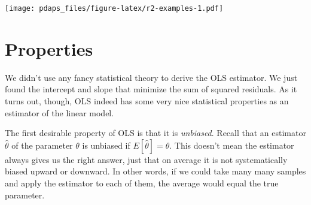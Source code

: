 \documentclass[12pt,oneside,openany]{book}
\begin{document}
\texttt{[image: pdaps\_files/figure-latex/r2-examples-1.pdf]}

\section{Properties}\label{properties}

We didn't use any fancy statistical theory to derive the OLS estimator.
We just found the intercept and slope that minimize the sum of squared
residuals. As it turns out, though, OLS indeed has some very nice
statistical properties as an estimator of the linear model.

The first desirable property of OLS is that it is \emph{unbiased}.
Recall that an estimator \(\hat{\theta}\) of the parameter \(\theta\) is
unbiased if \(E[\hat{\theta}] = \theta\). This doesn't mean the
estimator always gives us the right answer, just that on average it is
not systematically biased upward or downward. In other words, if we
could take many many samples and apply the estimator to each of them,
the average would equal the true parameter.
\end{document}
